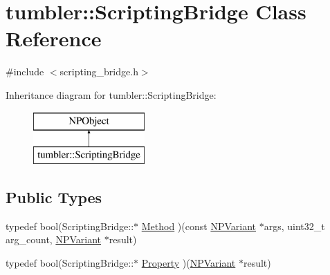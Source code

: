 \hypertarget{classtumbler_1_1_scripting_bridge}{
\section{tumbler::ScriptingBridge Class Reference}
\label{classtumbler_1_1_scripting_bridge}
}


{\ttfamily \#include $<$scripting\_\-bridge.h$>$}

Inheritance diagram for tumbler::ScriptingBridge:\begin{figure}[H]
\begin{center}
\leavevmode
\includegraphics[height=2cm]{classtumbler_1_1_scripting_bridge}
\end{center}
\end{figure}
\subsection*{Public Types}
\begin{DoxyCompactItemize}
\item 
typedef bool(ScriptingBridge::$\ast$ \hyperlink{classtumbler_1_1_scripting_bridge_addb1badb0e891b38c6d90767342b5bb3}{Method} )(const \hyperlink{struct___n_p_variant}{NPVariant} $\ast$args, uint32\_\-t arg\_\-count, \hyperlink{struct___n_p_variant}{NPVariant} $\ast$result)
\item 
typedef bool(ScriptingBridge::$\ast$ \hyperlink{classtumbler_1_1_scripting_bridge_ad7507ce0e5c8f49fde790c743447f3c3}{Property} )(\hyperlink{struct___n_p_variant}{NPVariant} $\ast$result)
\end{DoxyCompactItemize}
